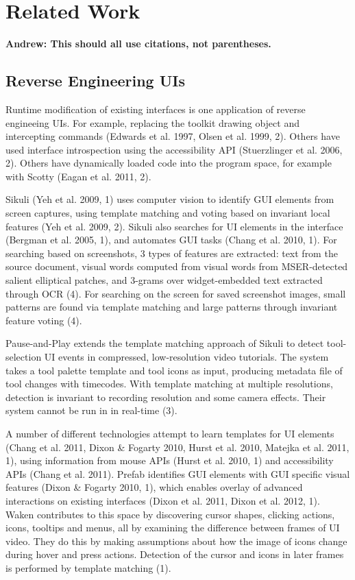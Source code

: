 \documentclass[12pt]{memoir}
\begin{document}
\section{Related Work}

\textbf{Andrew: This should all use citations, not parentheses.}

\subsection{Reverse Engineering UIs}

Runtime modification of existing interfaces is one application of reverse 
engineeing UIs.  For example, replacing the toolkit drawing object and 
intercepting commands (Edwards et al. 1997, Olsen et al. 1999, 2).  Others 
have used interface introspection using the accessibility API 
(Stuerzlinger et al. 2006, 2).  Others have dynamically loaded code into 
the program space, for example with Scotty (Eagan et al. 2011, 2).

Sikuli (Yeh et al. 2009, 1) uses computer vision to identify GUI elements from 
screen captures, using template matching and voting based on invariant local 
features (Yeh et al. 2009, 2).  Sikuli also searches for UI elements in the 
interface (Bergman et al. 2005, 1), and automates GUI tasks (Chang et al. 2010, 
1).  For searching based on screenshots, 3 types of features are extracted: 
text from the source document, visual words computed from visual words from 
MSER-detected salient elliptical patches, and 3-grams over widget-embedded 
text extracted through OCR (4).  For searching on the screen for saved 
screenshot images, small patterns are found via template matching and large 
patterns through invariant feature voting (4).

Pause-and-Play extends the template matching approach of Sikuli to detect 
tool-selection UI events in compressed, low-resolution video tutorials.  
The system takes a tool palette template and tool icons as input, 
producing metadata file of tool changes with timecodes.  With template 
matching at multiple resolutions, detection is invariant to recording 
resolution and some camera effects.  Their system cannot be run in in 
real-time (3).

A number of different technologies attempt to learn templates for UI 
elements (Chang et al. 2011, Dixon \& Fogarty 2010, Hurst et al. 2010, 
Matejka et al. 2011, 1), using information from mouse APIs (Hurst et al. 
2010, 1) and accessibility APIs (Chang et al. 2011).  Prefab identifies GUI 
elements with GUI specific visual features (Dixon \& Fogarty 2010, 1), which 
enables overlay of advanced interactions on existing interfaces (Dixon et al. 
2011, Dixon et al. 2012, 1).  Waken contributes to this space by discovering 
cursor shapes, clicking actions, icons, tooltips and menus, all by examining 
the difference between frames of UI video.  They do this by making assumptions 
about how the image of icons change during hover and press actions.  Detection 
of the cursor and icons in later frames is performed by template matching (1).
\end{document}
